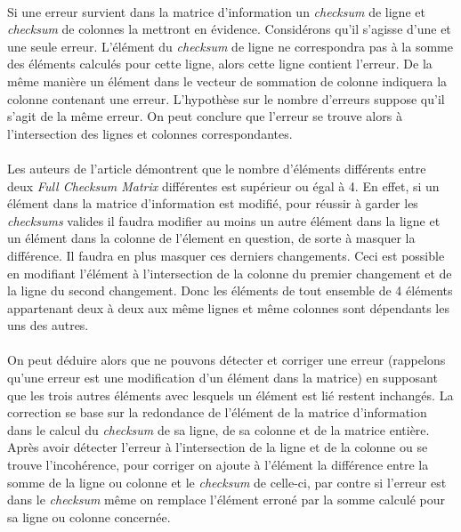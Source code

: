 \documentclass[a4paper,10pt]{report}
\begin{document}
\paragraph*{}
Si une erreur survient dans la matrice d’information un \textit{checksum} de ligne et \textit{checksum} de colonnes 
la mettront en évidence.\newline
Considérons qu’il s’agisse d’une et une seule erreur. L’élément du \textit{checksum} de ligne ne correspondra pas 
à la somme des éléments calculés pour cette ligne, alors cette ligne contient l’erreur. De la même manière un élément 
dans le vecteur de sommation de colonne indiquera la colonne contenant une erreur. L’hypothèse sur le nombre d’erreurs 
suppose qu’il s’agit de la même erreur. On peut conclure que l’erreur se trouve alors à l’intersection des lignes et 
colonnes correspondantes.
\paragraph*{}
Les auteurs de l’article démontrent que le nombre d’éléments différents entre deux \textit{Full Checksum Matrix} différentes 
est supérieur ou égal à 4. En effet, si un élément dans la matrice d’information est modifié, pour réussir à garder 
les \textit{checksums} valides il faudra modifier au moins un autre élément dans la ligne et un élément dans la colonne de 
l'élement en question, de sorte à masquer la différence. Il faudra en plus masquer ces derniers changements. Ceci est possible
en modifiant l'élément à l'intersection de la colonne du premier changement et de la ligne du second changement. Donc les 
éléments de tout ensemble de 4 éléments appartenant deux à deux aux même lignes et même colonnes sont dépendants les uns des autres.
\paragraph*{}
On peut déduire alors que ne pouvons détecter et corriger une erreur (rappelons qu’une erreur est une modification d’un
élément dans la matrice) en supposant que les trois autres éléments avec lesquels un élément est lié restent inchangés.
La correction se base sur la redondance de l’élément de la matrice d’information dans le calcul du \textit{checksum} de 
sa ligne, de sa colonne et de la matrice entière. Après avoir détecter l’erreur à l’intersection de la ligne et de la 
colonne ou se trouve l’incohérence, pour corriger on ajoute à l’élément la différence entre la somme de la ligne ou 
colonne et le \textit{checksum} de celle-ci, par contre si l’erreur est dans le \textit{checksum} même on remplace 
l’élément erroné par la somme calculé pour sa ligne ou colonne concernée.
\end{document}
